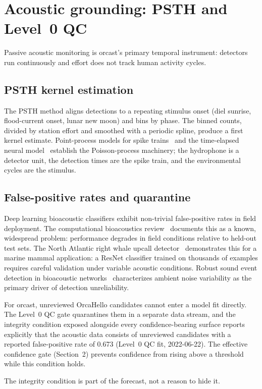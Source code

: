\section{Acoustic grounding: PSTH and Level~0 QC}

Passive acoustic monitoring is orcast's primary temporal instrument: detectors run continuously and effort does not track human activity cycles.

\subsection{PSTH kernel estimation}

The PSTH method aligns detections to a repeating stimulus onset (diel sunrise, flood-current onset, lunar new moon) and bins by phase. The binned counts, divided by station effort and smoothed with a periodic spline, produce a first kernel estimate. Point-process models for spike trains~\cite{arxiv201004875} and the time-elapsed neural model~\cite{arxiv150602361} establish the Poisson-process machinery; the hydrophone is a detector unit, the detection times are the spike train, and the environmental cycles are the stimulus.

\subsection{False-positive rates and quarantine}

Deep learning bioacoustic classifiers exhibit non-trivial false-positive rates in field deployment. The computational bioacoustics review~\cite{arxiv211206725} documents this as a known, widespread problem: performance degrades in field conditions relative to held-out test sets. The North Atlantic right whale upcall detector~\cite{arxiv200109127} demonstrates this for a marine mammal application: a ResNet classifier trained on thousands of examples requires careful validation under variable acoustic conditions. Robust sound event detection in bioacoustic networks~\cite{arxiv190508352} characterizes ambient noise variability as the primary driver of detection unreliability.

For orcast, unreviewed OrcaHello candidates cannot enter a model fit directly. The Level~0 QC gate quarantines them in a separate data stream, and the integrity condition exposed alongside every confidence-bearing surface reports explicitly that the acoustic data consists of unreviewed candidates with a reported false-positive rate of 0.673 (Level~0 QC fit, 2022-06-22). The effective confidence gate (Section~2) prevents confidence from rising above a threshold while this condition holds.

The integrity condition is part of the forecast, not a reason to hide it.
